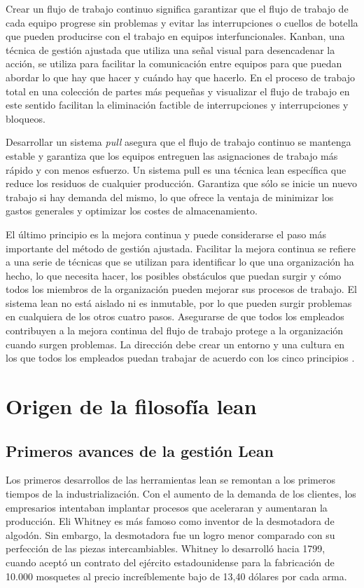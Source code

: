 Crear un flujo de trabajo continuo significa garantizar que el flujo de trabajo de cada equipo progrese sin problemas y evitar las interrupciones o cuellos de botella que pueden producirse con el trabajo en equipos interfuncionales.
Kanban, una técnica de gestión ajustada que utiliza una señal visual para desencadenar la acción, se utiliza para facilitar la comunicación entre equipos para que puedan abordar lo que hay que hacer y cuándo hay que hacerlo.
En el proceso de trabajo total en una colección de partes más pequeñas y visualizar el flujo de trabajo en este sentido facilitan la eliminación factible de interrupciones y interrupciones y bloqueos.

Desarrollar un sistema \textit{pull} asegura que el flujo de trabajo continuo se mantenga estable y garantiza que los equipos entreguen las asignaciones de trabajo más rápido y con menos esfuerzo. Un sistema pull es una técnica lean específica que reduce los residuos de cualquier producción. Garantiza que sólo se inicie un nuevo trabajo si hay demanda del mismo, lo que ofrece la ventaja de minimizar los gastos generales y optimizar los costes de almacenamiento.

El último principio es la mejora continua y puede considerarse el paso más importante del método de gestión ajustada.
Facilitar la mejora continua se refiere a una serie de técnicas que se utilizan para identificar lo que una organización ha hecho, lo que necesita hacer, los posibles obstáculos que puedan surgir y cómo todos los miembros de la organización pueden mejorar sus procesos de trabajo.
El sistema lean no está aislado ni es inmutable, por lo que pueden surgir problemas en cualquiera de los otros cuatro pasos.
Asegurarse de que todos los empleados contribuyen a la mejora continua del flujo de trabajo protege a la organización cuando surgen problemas.
La dirección debe crear un entorno y una cultura en los que todos los empleados puedan trabajar de acuerdo con los cinco principios \cite{ohno_toyota_1988,bertagnolli_lean_2018}.

\section{Origen de la filosofía lean}

\subsection{Primeros avances de la gestión Lean}

Los primeros desarrollos de las herramientas lean se remontan a los primeros tiempos de la industrialización.
Con el aumento de la demanda de los clientes, los empresarios intentaban implantar procesos que aceleraran y aumentaran la producción.
Eli Whitney es más famoso como inventor de la desmotadora de algodón.
Sin embargo, la desmotadora fue un logro menor comparado con su perfección de las piezas intercambiables.
Whitney lo desarrolló hacia 1799, cuando aceptó un contrato del ejército estadounidense para la fabricación de 10.000 mosquetes al precio increíblemente bajo de 13,40 dólares por cada arma.

